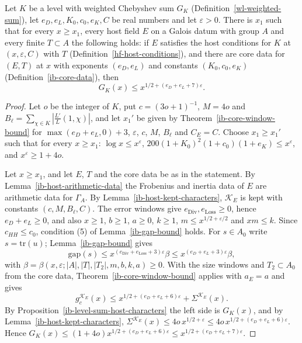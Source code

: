 \begin{theorem}\label{ib-host-window-bound}
Let $K$ be a level with weighted Chebyshev sum $G_K$
(Definition~\ref{wl-weighted-sum}), let $e_D,e_L,K_0,c_0,e_K,C$ be real numbers
and let $\varepsilon>0$. There is $x_1$ such that for every $x\geq x_1$, every
host field $E$ on a Galois datum with group $A$ and every finite $T\subset A$ the
following holds:
if $E$ satisfies the host conditions for $K$ at $(x,\varepsilon,C)$ with $T$
(Definition~\ref{hf-host-conditions}), and there are core data for $(E,T)$ at
$x$ with exponents $(e_D,e_L)$ and constants $(K_0,c_0,e_K)$
(Definition~\ref{ib-core-data}), then
\[
 G_K(x)\leq x^{1/2+(e_D+e_L+7)\varepsilon}.
\]
\end{theorem}
\begin{proof}
Let $o$ be the integer of $K$, put $c=(3o+1)^{-1}$, $M=4o$ and
$B_\ell=\sum_{\chi\in K}|\frac{L'}{L}(1,\chi)|$, and let $x_1'$ be given by
Theorem~\ref{ib-core-window-bound} for $\max(e_D+e_L,0)+3$, $\varepsilon$, $c$,
$M$, $B_\ell$ and $C_E=C$. Choose $x_1\geq x_1'$ such that for every
$x\geq x_1$: $\log x\leq x^\varepsilon$,
$200(1+K_0)^2(1+c_0)(1+e_K)\leq x^\varepsilon$, and $x^\varepsilon\geq1+4o$.

Let $x\geq x_1$, and let $E$, $T$ and the core data be as in the statement. By
Lemma~\ref{ib-host-arithmetic-data} the Frobenius and inertia data of $E$ are
arithmetic data for $\Gamma_A$. By Lemma~\ref{ib-host-kept-characters},
$\mathcal K_E$ is kept with constants $(c,M,B_\ell,C)$. The error windows give
$e_{\mathrm{Div}},e_{\mathrm{Loss}}\geq0$, hence $e_D+e_L\geq0$, and also $x\geq1$,
$b\geq1$, $a\geq0$, $k\geq1$, $m\leq x^{1/2+\varepsilon/2}$ and $xm\leq k$.
Since $c_{HH}\leq c_0$, condition (5) of Lemma~\ref{ib-gap-bound} holds. For
$s\in A_0$ write $s=\mathrm{tr}(u)$; Lemma~\ref{ib-gap-bound} gives
\[
 \mathrm{gap}(s)\leq x^{(e_{\mathrm{Div}}+e_{\mathrm{Loss}}+3)\varepsilon}\beta
 \leq x^{(e_D+e_L+3)\varepsilon}\beta,
\]
with $\beta=\beta(x,\varepsilon;|A|,|T|,|T_2|,m,b,k,a)\geq0$. With the size
windows and $T_2\subset A_0$ from the core data, Theorem~\ref{ib-core-window-bound}
applies with $a_E=a$ and gives
\[
 g^{\mathcal K_E}_c(x)\leq x^{1/2+(e_D+e_L+6)\varepsilon}+\Sigma^{\mathcal K_E}(x).
\]
By Proposition~\ref{ib-level-sum-host-characters} the left side is $G_K(x)$, and
by Lemma~\ref{ib-host-kept-characters},
$\Sigma^{\mathcal K_E}(x)\leq4o\,x^{1/2+\varepsilon}\leq4o\,x^{1/2+(e_D+e_L+6)\varepsilon}$.
Hence $G_K(x)\leq(1+4o)x^{1/2+(e_D+e_L+6)\varepsilon}\leq x^{1/2+(e_D+e_L+7)\varepsilon}$.
\end{proof}

